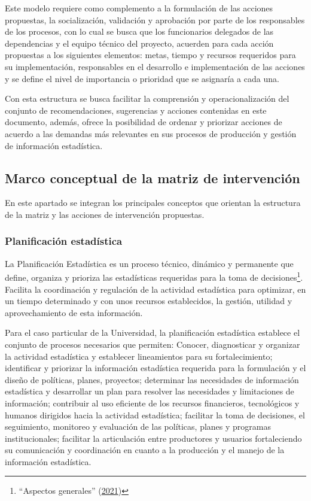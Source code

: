 \documentclass[
]{book}
\begin{document}
Este modelo requiere como complemento a la formulación de las acciones propuestas, la socialización, validación y aprobación por parte de los responsables de los procesos, con lo cual se busca que los funcionarios delegados de las dependencias y el equipo técnico del proyecto, acuerden para cada acción propuestas a los siguientes elementos: metas, tiempo y recursos requeridos para su implementación, responsables en el desarrollo e implementación de las acciones y se define el nivel de importancia o prioridad que se asignaría a cada una.

Con esta estructura se busca facilitar la comprensión y operacionalización del conjunto de recomendaciones, sugerencias y acciones contenidas en este documento, además, ofrece la posibilidad de ordenar y priorizar acciones de acuerdo a las demandas más relevantes en sus procesos de producción y gestión de información estadística.

\hypertarget{marco-conceptual-de-la-matriz-de-intervenciuxf3n}{%
\subsection{Marco conceptual de la matriz de intervención}\label{marco-conceptual-de-la-matriz-de-intervenciuxf3n}}

En este apartado se integran los principales conceptos que orientan la estructura de la matriz y las acciones de intervención propuestas.

\hypertarget{planificaciuxf3n-estaduxedstica}{%
\subsubsection{Planificación estadística}\label{planificaciuxf3n-estaduxedstica}}

La Planificación Estadística es un proceso técnico, dinámico y permanente que define, organiza y prioriza las estadísticas requeridas para la toma de decisiones\footnote{{``{Aspectos generales}''} (\protect\hyperlink{ref-BibEntry2021May}{2021})}. Facilita la coordinación y regulación de la actividad estadística para optimizar, en un tiempo determinado y con unos recursos establecidos, la gestión, utilidad y aprovechamiento de esta información.

Para el caso particular de la Universidad, la planificación estadística establece el conjunto de procesos necesarios que permiten: Conocer, diagnosticar y organizar la actividad estadística y establecer lineamientos para su fortalecimiento; identificar y priorizar la información estadística requerida para la formulación y el diseño de políticas, planes, proyectos; determinar las necesidades de información estadística y desarrollar un plan para resolver las necesidades y limitaciones de información; contribuir al uso eficiente de los recursos financieros, tecnológicos y humanos dirigidos hacia la actividad estadística; facilitar la toma de decisiones, el seguimiento, monitoreo y evaluación de las políticas, planes y programas institucionales; facilitar la articulación entre productores y usuarios fortaleciendo su comunicación y coordinación en cuanto a la producción y el manejo de la información estadística.
\end{document}
